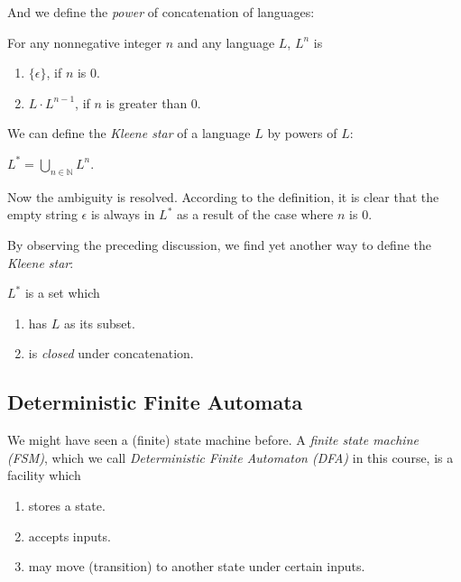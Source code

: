 \documentclass[11pt]{article}
\begin{document}
And we define the \emph{power} of concatenation of languages:
\begin{definition}
For any nonnegative integer $n$ and any language $L$, $L^n$ is
\begin{enumerate}
\item $\{\epsilon\}$, if $n$ is $0$.
\item $L \cdot L^{n-1}$, if $n$ is greater than $0$.
\end{enumerate}
\end{definition}

We can define the \emph{Kleene star} of a language $L$ by powers of $L$:
\begin{definition}
$L^\ast = \bigcup_{n \in \mathbb{N}}L^n$.
\end{definition}

Now the ambiguity is resolved. According to the definition, it is clear that the empty string $\epsilon$ is
always in $L^\ast$ as a result of the case where $n$ is $0$.

By observing the preceding discussion, we find yet another way to define the \emph{Kleene star}:
\begin{definition}
$L^\ast$ is a set which
\begin{enumerate}
\item has $L$ as its subset.
\item is \emph{closed} under concatenation.
\end{enumerate}
\end{definition}

\subsection{Deterministic Finite Automata}

We might have seen a (finite) state machine before. A \emph{finite state machine (FSM)}, which we call
\emph{Deterministic Finite Automaton (DFA)} in this course, is a facility which
\begin{enumerate}
\item stores a state.
\item accepts inputs.
\item may move (transition) to another state under certain inputs.
\end{enumerate}
\end{document}
